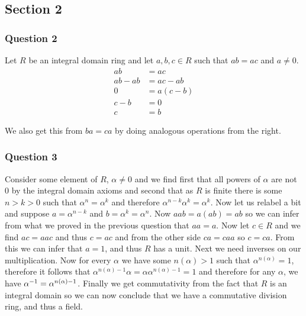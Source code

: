 \documentclass{article}
\begin{document}
\subsection{Section 2}

\subsubsection{Question 2}
Let $R$ be an integral domain ring and let $a,b,c\in R$ such that $ab=ac$ and $a\not=0$.
\begin{align*}
ab&=ac \\
 ab-ab&=ac-ab \\
 0 &= a(c-b) \\
 c-b &= 0 \\
 c&=b
\end{align*}

We also get this from $ba = ca$ by doing analogous operations from the right.

\subsubsection{Question 3}
Consider some element of $R$, $\alpha\not=0$ and we find first that all powers of $\alpha$ are not $0$ by the integral domain axioms and second that as $R$ is finite there is some $n>k>0$ such that $\alpha^n=\alpha^k$ and therefore $\alpha^{n-k}\alpha^k=\alpha^k$. Now let us relabel a bit and suppose $a = \alpha^{n-k}$ and $b= \alpha^k=\alpha^n$. Now $aab = a(ab) = ab$ so we can infer from what we proved in the previous question that $aa = a$. Now let $c \in R$ and we find $ac = aac$ and thus $c = ac$ and from the other side $ca = caa$ so $c = ca$. From this we can infer that $a = 1$, and thus $R$ has a unit. Next we need inverses on our multiplication. Now for every $\alpha$ we have some $n(\alpha)> 1$ such that $\alpha^{n(\alpha)} = 1$, therefore it follows that $\alpha^{n(\alpha)-1}\alpha = \alpha\alpha^{n(\alpha)-1} = 1$ and therefore for any $\alpha$, we have ${\alpha}^{-1} = \alpha^{n(\alpha)-1}$. Finally we get commutativity from the fact that $R$ is an integral domain so we can now conclude that we have a commutative division ring, and thus a field.
\end{document}
